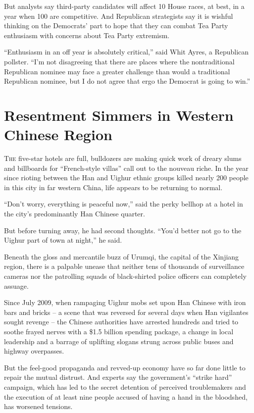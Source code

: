 ﻿\documentclass[12pt]{article}
\begin{document}
But analysts say third-party candidates will affect 10 House races, at best, in a year when 100 are
competitive. And Republican strategists say it is wishful thinking on the Democrats' part to hope
that they can combat Tea Party enthusiasm with concerns about Tea Party extremism.

``Enthusiasm in an off year is absolutely critical,'' said Whit Ayres, a Republican pollster. ``I'm
not disagreeing that there are places where the nontraditional Republican nominee may face a greater
challenge than would a traditional Republican nominee, but I do not agree that ergo the Democrat is
going to win.''

\pagebreak
\section{Resentment Simmers in Western Chinese Region}

\lettrine{T}{he} five-star hotels are full, bulldozers are making quick
work of dreary slums and billboards for ``French-style villas'' call out to the nouveau riche. In
the year since rioting between the Han and Uighur ethnic groups killed nearly 200 people in this
city in far western China, life appears to be returning to normal.

``Don't worry, everything is peaceful now,'' said the perky bellhop at a hotel in the city's
predominantly Han Chinese quarter.

But before turning away, he had second thoughts. ``You'd better not go to the Uighur part of town at
night,'' he said.

Beneath the gloss and mercantile buzz of Urumqi, the capital of the Xinjiang region, there is a
palpable unease that neither tens of thousands of surveillance cameras nor the patrolling squads of
black-shirted police officers can completely assuage.

Since July 2009, when rampaging Uighur mobs set upon Han Chinese with iron bars and bricks -- a
scene that was reversed for several days when Han vigilantes sought revenge -- the Chinese
authorities have arrested hundreds and tried to soothe frayed nerves with a \$1.5 billion spending
package, a change in local leadership and a barrage of uplifting slogans strung across public buses
and highway overpasses.

But the feel-good propaganda and revved-up economy have so far done little to repair the mutual
distrust. And experts say the government's ``strike hard'' campaign, which has led to the secret
detention of perceived troublemakers and the execution of at least nine people accused of having a
hand in the bloodshed, has worsened tensions.
\end{document}
